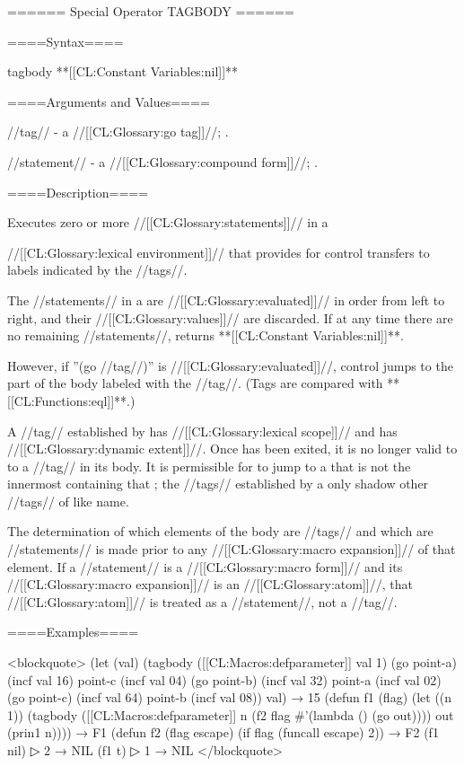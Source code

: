====== Special Operator TAGBODY ======

====Syntax====

\DefspecWithValues tagbody {} {**[[CL:Constant Variables:nil]]**}

====Arguments and Values====

//tag// - a //[[CL:Glossary:go tag]]//; \noeval.

//statement// - a //[[CL:Glossary:compound form]]//; \evalspecial.

====Description====

Executes zero or more //[[CL:Glossary:statements]]// in a

//[[CL:Glossary:lexical environment]]// that provides for control transfers to labels indicated by the //tags//.

The //statements// in a  are //[[CL:Glossary:evaluated]]// in order from left to right, and their //[[CL:Glossary:values]]// are discarded. If at any time there are no remaining //statements//,  returns **[[CL:Constant Variables:nil]]**.

However, if ''(go //tag//)'' is //[[CL:Glossary:evaluated]]//, control jumps to the part of the body labeled with the //tag//. (Tags are compared with **[[CL:Functions:eql]]**.)

A //tag// established by  has //[[CL:Glossary:lexical scope]]// and has //[[CL:Glossary:dynamic extent]]//. Once  has been exited, it is no longer valid to  to a //tag// in its body. It is permissible for  to jump to a  that is not the innermost  containing that ; the //tags// established by a  only shadow other //tags// of like name.

The determination of which elements of the body are //tags// and which are //statements// is made prior to any //[[CL:Glossary:macro expansion]]// of that element. If a //statement// is a //[[CL:Glossary:macro form]]// and its //[[CL:Glossary:macro expansion]]// is an //[[CL:Glossary:atom]]//, that //[[CL:Glossary:atom]]// is treated as a //statement//, not a //tag//.

====Examples====

<blockquote> (let (val) (tagbody ([[CL:Macros:defparameter]] val 1) (go point-a) (incf val 16) point-c (incf val 04) (go point-b) (incf val 32) point-a (incf val 02) (go point-c) (incf val 64) point-b (incf val 08)) val) → 15 (defun f1 (flag) (let ((n 1)) (tagbody ([[CL:Macros:defparameter]] n (f2 flag #'(lambda () (go out)))) out (prin1 n)))) → F1 (defun f2 (flag escape) (if flag (funcall escape) 2)) → F2 (f1 nil)
▷ 2 → NIL (f1 t)
▷ 1 → NIL </blockquote>

